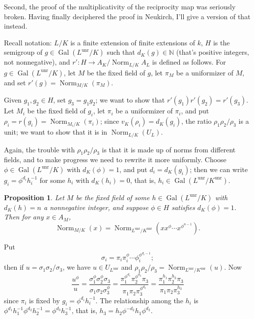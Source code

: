 \documentclass[12pt]{article}
\def\NN{\mathbb{N}}
\DeclareMathOperator{\Gal}{Gal}
\DeclareMathOperator{\Norm}{Norm}
\DeclareMathOperator{\unr}{unr}
\newtheorem{prop}[theorem]{Proposition}
\begin{document}
Second, the proof of the multiplicativity of the reciprocity map was
seriously broken. Having finally deciphered the proof in Neukirch, I'll
give a version of that instead.

Recall notation: $L/K$ is a finite extension of finite extensions of $k$,
$H$ is the semigroup of $g \in \Gal(L^{\unr}/K)$ such that $d_K(g) \in \NN$
(that's positive integers, not nonnegative), and $r': H \to A_K/\Norm_{L/K} A_L$
is defined as follows. For $g \in \Gal(L^{\unr}/K)$, let $M$ be the fixed
field of $g$, let $\pi_M$ be a uniformizer of $M$, and set
$r'(g) = \Norm_{M/K}(\pi_M)$.

Given $g_1, g_2 \in H$, set $g_3 = g_1g_2$; we want to show that
$r'(g_1)r'(g_2) = r'(g_3)$. Let $M_i$ be the fixed field of $g_i$, let
$\pi_i$ be a uniformizer of $\pi_i$, and put $\rho_i = r(g_i)
= \Norm_{M_i/K}(\pi_i)$; since $v_K(\rho_i) = d_K(g_i)$, the ratio
$\rho_1 \rho_2/\rho_3$ is a unit; we want to show
that it is in $\Norm_{L/K}(U_L)$.

Again, the trouble with $\rho_1\rho_2/\rho_3$ is that it is made up of
norms from different fields, and to make progress we need to rewrite it
more uniformly. Choose $\phi \in \Gal(L^{\unr}/K)$ with $d_K(\phi)=1$,
and put $d_i = d_K(g_i)$; then we can write $g_i = \phi^{d_i} h_i^{-1}$
for some $h_i$ with $d_K(h_i) = 0$, that is, $h_i \in \Gal(L^{\unr}/K^{\unr})$.

\begin{prop}
Let $M$ be the fixed field of some $h \in \Gal(L^{\unr}/K)$ with
$d_K(h)=n$ a nonnegative integer, and suppose $\phi \in H$ satisfies
$d_K(\phi)=1$. Then for any $x \in A_M$,
\[
\Norm_{M/K}(x) = \Norm_{L^{\unr}/K^{\unr}}(x x^{\phi}\cdots x^{\phi^{n-1}}).
\]
\end{prop}
Put
\[
\sigma_i = \pi_i \pi_i^{\phi} \cdots \phi_i^{\phi^{d_i-1}};
\]
then if $u = \sigma_1 \sigma_2/\sigma_3$, we have $u \in U_{L^{\unr}}$
and $\rho_1\rho_2/\rho_3 = \Norm_{L^{\unr}/K^{\unr}}(u)$. Now
\[
  \frac{u^\phi}{u} = \frac{\sigma_1^\phi \sigma_2^\phi \sigma_3}{\sigma_1
\sigma_2 \sigma_3^\phi}
= \frac{\pi_1^{\phi^{d_1}} \pi_2^{\phi^{d_2}} \pi_3}{\pi_1 \pi_2
\pi_3^{\phi^{d_3}}}
= \frac{\pi_1^{h_1} \pi_2^{h_2} \pi_3}{\pi_1 \pi_2 \pi_3^{h_3}}
\]
since $\pi_i$ is fixed by $g_i = \phi^{d_i} h_i^{-1}$.
The relationship among the $h_i$ is $\phi^{d_1} h_1^{-1} \phi^{d_2}
h_2^{-1} = \phi^{d_3} h_3^{-1}$, that is,
$h_3 = h_2 \phi^{-d_2} h_1 \phi^{d_2}$.
\end{document}
